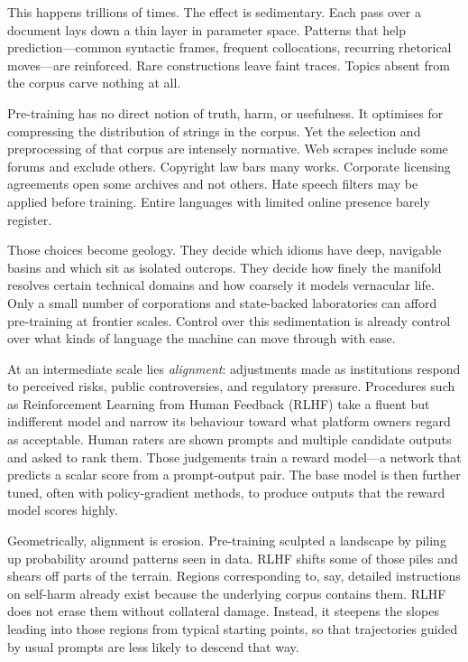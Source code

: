 \documentclass[12pt,a4paper]{article}
\begin{document}
This happens trillions of times. The effect is sedimentary. Each pass over a document lays down a thin layer in parameter space. Patterns that help prediction---common syntactic frames, frequent collocations, recurring rhetorical moves---are reinforced. Rare constructions leave faint traces. Topics absent from the corpus carve nothing at all.

Pre-training has no direct notion of truth, harm, or usefulness. It optimises for compressing the distribution of strings in the corpus. Yet the selection and preprocessing of that corpus are intensely normative. Web scrapes include some forums and exclude others. Copyright law bars many works. Corporate licensing agreements open some archives and not others. Hate speech filters may be applied before training. Entire languages with limited online presence barely register.

Those choices become geology. They decide which idioms have deep, navigable basins and which sit as isolated outcrops. They decide how finely the manifold resolves certain technical domains and how coarsely it models vernacular life. Only a small number of corporations and state-backed laboratories can afford pre-training at frontier scales. Control over this sedimentation is already control over what kinds of language the machine can move through with ease.

At an intermediate scale lies \emph{alignment}: adjustments made as institutions respond to perceived risks, public controversies, and regulatory pressure. Procedures such as Reinforcement Learning from Human Feedback (RLHF) \cite{gabriel2020artificial,liang2022holistic} take a fluent but indifferent model and narrow its behaviour toward what platform owners regard as acceptable. Human raters are shown prompts and multiple candidate outputs and asked to rank them. Those judgements train a reward model---a network that predicts a scalar score from a prompt-output pair. The base model is then further tuned, often with policy-gradient methods, to produce outputs that the reward model scores highly.

Geometrically, alignment is erosion. Pre-training sculpted a landscape by piling up probability around patterns seen in data. RLHF shifts some of those piles and shears off parts of the terrain. Regions corresponding to, say, detailed instructions on self-harm already exist because the underlying corpus contains them. RLHF does not erase them without collateral damage. Instead, it steepens the slopes leading into those regions from typical starting points, so that trajectories guided by usual prompts are less likely to descend that way.
\end{document}
